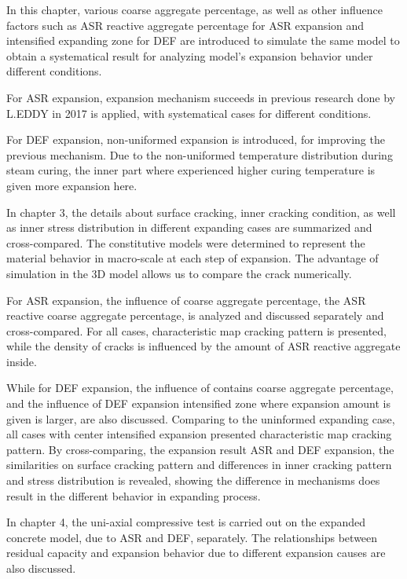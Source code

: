 In this chapter, various coarse aggregate percentage, as well as other influence factors such as ASR reactive aggregate percentage for ASR expansion and intensified expanding zone for DEF are introduced to simulate the same model to obtain a systematical result for analyzing model's expansion behavior under different conditions.

For ASR expansion, expansion mechanism succeeds in previous research done by L.EDDY in 2017 is applied, with systematical cases for different conditions.

For DEF expansion, non-uniformed expansion is introduced, for improving the previous mechanism. Due to the non-uniformed temperature distribution during steam curing, the inner part where experienced higher curing temperature is given more expansion here.

%

In chapter 3, the details about surface cracking, inner cracking condition, as well as inner stress distribution in different expanding cases are summarized and cross-compared. The constitutive models were determined to represent the material behavior in macro-scale at each step of expansion. The advantage of simulation in the 3D model allows us to compare the crack numerically.

For ASR expansion, the influence of coarse aggregate percentage, the ASR reactive coarse aggregate percentage, is analyzed and discussed separately and cross-compared. For all cases, characteristic map cracking pattern is presented, while the density of cracks is influenced by the amount of ASR reactive aggregate inside.

While for DEF expansion, the influence of contains coarse aggregate percentage, and the influence of DEF expansion intensified zone where expansion amount is given is larger, are also discussed. Comparing to the uninformed expanding case, all cases with center intensified expansion presented characteristic map cracking pattern. By cross-comparing, the expansion result ASR and DEF expansion, the similarities on surface cracking pattern and differences in inner cracking pattern and stress distribution is revealed, showing the difference in mechanisms does result in the different behavior in expanding process.

%

In chapter 4, the uni-axial compressive test is carried out on the expanded concrete model, due to ASR and DEF, separately. The relationships between residual capacity and expansion behavior due to different expansion causes are also discussed.

